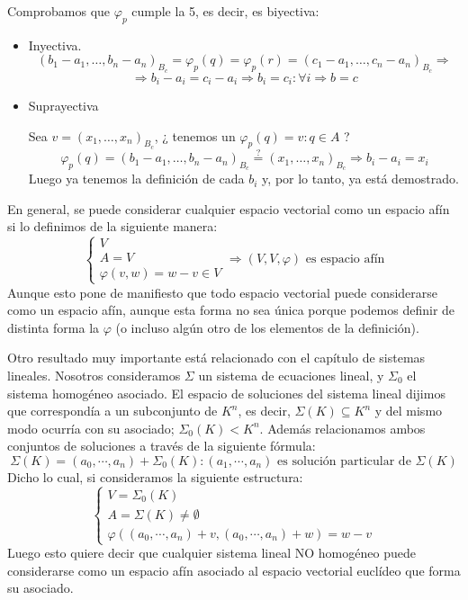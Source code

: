 \documentclass[10pt,a4paper,openright]{book}
\theoremstyle{break}
\begin{document}
Comprobamos que $\varphi_p $ cumple la 5, es decir, es biyectiva:
\begin{itemize}
\item Inyectiva.
$$(b_1 - a_1 , \ldots , b_n - a_n)_{B_c}= \varphi_p (q) = \varphi_p (r) = (c_1 - a_1 , \ldots , c_n - a_n)_{B_c} \Rightarrow $$
$$\Rightarrow b_i - a_i = c_i - a_i \Rightarrow b_i = c_i : \forall i \Rightarrow b = c$$

\item Suprayectiva

Sea $v=(x_1, \ldots, x_n)_{B_c}$, ¿ tenemos un $ \varphi_p (q) = v : q\in A$ ?
$$\varphi_p (q)=(b_1 - a_1 , \ldots , b_n - a_n)_{B_c}\overset{?}{=}(x_1, \ldots, x_n)_{B_c} \Rightarrow b_i - a_i = x_i$$
Luego ya tenemos la definición de cada $b_i$ y, por lo tanto, ya está demostrado.
\end{itemize}


En general, se puede considerar cualquier espacio vectorial como un espacio afín si lo definimos de la siguiente manera:
$$\begin{cases} V \\ A = V \\ \varphi(v,w) = w - v \in V \end{cases} \Rightarrow (V,V,\varphi)\mbox{ es espacio afín}$$
Aunque esto pone de manifiesto que todo espacio vectorial puede considerarse como un espacio afín, aunque esta forma no sea única porque podemos definir de distinta forma la $\varphi$ (o incluso algún otro de los elementos de la definición).

Otro resultado muy importante está relacionado con el capítulo de sistemas lineales. Nosotros consideramos $\Sigma $ un sistema de ecuaciones lineal, y $\Sigma_0$ el sistema homogéneo asociado. El espacio de soluciones del sistema lineal dijimos que correspondía a un subconjunto de $K^n$, es decir, $\Sigma(K) \subseteq K^n$ y del mismo modo ocurría con su asociado; $\Sigma_0 (K) < K^n$. Además relacionamos ambos conjuntos de soluciones a través de la siguiente fórmula:
$$\Sigma(K) = (a_0, \cdots , a_n) + \Sigma_0(K): (a_1, \cdots, a_n)\mbox{ es solución particular de }\Sigma(K)$$
Dicho lo cual, si consideramos la siguiente estructura:
$$\begin{cases} V = \Sigma_0(K) \\ A = \Sigma(K)\neq \emptyset \\ \varphi((a_0, \cdots, a_n)+v, (a_0, \cdots, a_n)+ w) = w-v\end{cases}$$
Luego esto quiere decir que cualquier sistema lineal NO homogéneo puede considerarse como un espacio afín asociado al espacio vectorial euclídeo que forma su asociado.
\end{document}
